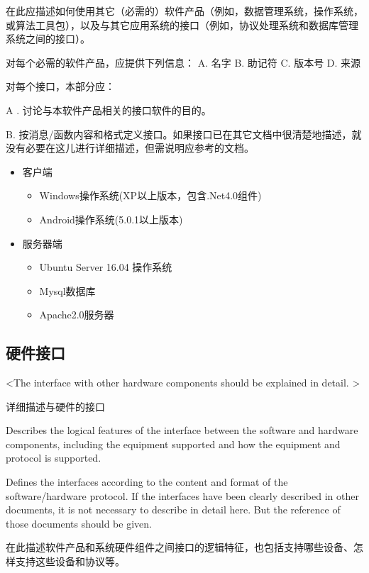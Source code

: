 在此应描述如何使用其它（必需的）软件产品（例如，数据管理系统，操作系统，或算法工具包），以及与其它应用系统的接口（例如，协议处理系统和数据库管理系统之间的接口）。

对每个必需的软件产品，应提供下列信息：
A.	名字
B.	助记符
C.	版本号
D.	来源

对每个接口，本部分应：

A .	讨论与本软件产品相关的接口软件的目的。

B.	按消息/函数内容和格式定义接口。如果接口已在其它文档中很清楚地描述，就没有必要在这儿进行详细描述，但需说明应参考的文档。
\fi
\begin{itemize}
\item 客户端
	\begin{itemize}
	\item Windows操作系统(XP以上版本，包含.Net4.0组件)
	\item Android操作系统(5.0.1以上版本)
	\end{itemize}
\item 服务器端
	\begin{itemize}
	\item Ubuntu Server 16.04 操作系统
	\item Mysql数据库
	\item Apache2.0服务器
	\end{itemize}
\end{itemize}




\subsection{硬件接口}
\iffalse
<The interface with other hardware components should be explained in detail. >

详细描述与硬件的接口

Describes the logical features of the interface between the software and hardware components, including the equipment supported and how the equipment and protocol is supported. 

Defines the interfaces according to the content and format of the software/hardware protocol. If the interfaces have been clearly described in other documents, it is not necessary to describe in detail here. But the reference of those documents should be given.

在此描述软件产品和系统硬件组件之间接口的逻辑特征，也包括支持哪些设备、怎样支持这些设备和协议等。
 

